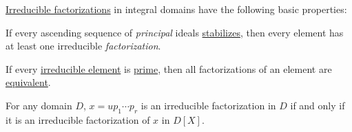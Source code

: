 \begin{proposition}\label{thm:def:irreducible_factorization}
  \hyperref[def:irreducible_factorization]{Irreducible factorizations} in integral domains have the following basic properties:
  \begin{thmenum}
     If every ascending sequence of \emph{principal} ideals \hyperref[def:stabilizing_sequence]{stabilizes}, then every element has at least one irreducible \emph{factorization}.

     If every \hyperref[def:domain_divisibility/irreducible]{irreducible element} is \hyperref[def:domain_divisibility/prime]{prime}, then all factorizations of an element are \hyperref[def:irreducible_factorization/equivalent]{equivalent}.

     For any domain \( D \), \( x = u p_1 \cdots p_r \) is an irreducible factorization in \( D \) if and only if it is an irreducible factorization of \( x \) in \( D[X] \).
  \end{thmenum}
\end{proposition}
